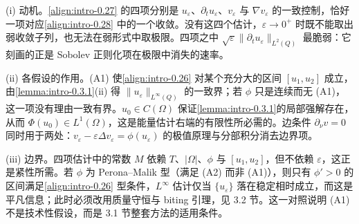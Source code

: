 \documentclass[../main.tex]{subfiles}
\begin{document}
\begin{remark}\label{remark:intro-0.3.2-动机}
(i) 动机。\eqref{align:intro-0.27} 的四项分别是 $u_\varepsilon$、$\partial_t u_\varepsilon$、$v_\varepsilon$ 与 $\nabla v_\varepsilon$ 的一致控制，恰好一项对应\eqref{align:intro-0.28} 中的一个收敛。没有这四个估计，$\varepsilon\to0^+$ 时既不能取出弱收敛子列，也无法在弱形式中取极限。四项之中 $\sqrt{\varepsilon}\|\partial_t u_\varepsilon\|_{L^2(Q)}$ 最脆弱：它刻画的正是 Sobolev 正则化项在极限中消失的速率。

(ii) 各假设的作用。(A1) 使\eqref{align:intro-0.26} 对某个充分大的区间 $[u_1,u_2]$ 成立，由\cref{lemma:intro-0.3.1}(ii) 得 $\|u_\varepsilon\|_{L^\infty(Q)}$ 的一致界；若 $\phi$ 只是连续而无 (A1)，这一项没有理由一致有界。$u_0\in C(\Omega)$ 保证\cref{lemma:intro-0.3.1}的局部强解存在，从而 $\Phi(u_0)\in L^1(\Omega)$，这是能量估计右端的有限性所必需的。边条件 $\partial_\nu v=0$ 同时用于两处：$v_\varepsilon-\varepsilon\Delta v_\varepsilon=\phi(u_\varepsilon)$ 的极值原理与分部积分消去边界项。

(iii) 边界。四项估计中的常数 $M$ 依赖 $T$、$|\Omega|$、$\phi$ 与 $[u_1,u_2]$，但不依赖 $\varepsilon$，这正是紧性所需。若 $\phi$ 为 Perona--Malik 型（满足 (A2) 而非 (A1)），则只有 $\phi'>0$ 的区间满足\eqref{align:intro-0.26} 型条件，$L^\infty$ 估计仅当 $\{u_\varepsilon\}$ 落在稳定相时成立，而这是平凡信息；此时必须改用质量守恒与 biting 引理，见 3.2 节。这一对照说明 (A1) 不是技术性假设，而是 3.1 节整套方法的适用条件。
\end{remark}
\end{document}
